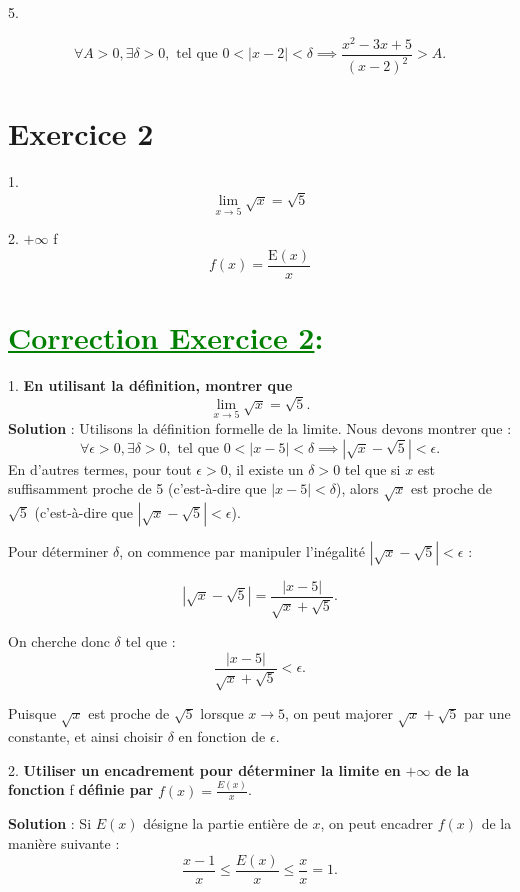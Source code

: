 \documentclass[12pt]{article}
\begin{document}
5. 

\[
\forall A > 0, \exists \delta > 0, \text{ tel que } 0 < |x - 2| < \delta \implies \frac{x^{2}-3x+5}{(x-2)^{2}} > A.
\]

\section*{Exercice 2}

1.  
\[\lim_{x \to 5} \sqrt{x} = \sqrt{5}\]

2.  $+\infty$  f \\
\[f(x) = \frac{\mathrm{E}(x)}{x}\]
\section*{\textcolor{green}{\underline{Correction Exercice 2}:}}

1. \textbf{En utilisant la définition, montrer que}
\[
\lim_{x \to 5} \sqrt{x} = \sqrt{5}.
\]
\textbf{Solution} : Utilisons la définition formelle de la limite. Nous devons montrer que :
\[
\forall \epsilon > 0, \exists \delta > 0, \text{ tel que } 0 < |x - 5| < \delta \implies |\sqrt{x} - \sqrt{5}| < \epsilon.
\]
En d'autres termes, pour tout \( \epsilon > 0 \), il existe un \( \delta > 0 \) tel que si \( x \) est suffisamment proche de 5 (c'est-à-dire que \( |x - 5| < \delta \)), alors \( \sqrt{x} \) est proche de \( \sqrt{5} \) (c'est-à-dire que \( |\sqrt{x} - \sqrt{5}| < \epsilon \)).

Pour déterminer \( \delta \), on commence par manipuler l'inégalité \( |\sqrt{x} - \sqrt{5}| < \epsilon \) :

\[
|\sqrt{x} - \sqrt{5}| = \frac{|x - 5|}{\sqrt{x} + \sqrt{5}}.
\]

On cherche donc \( \delta \) tel que :
\[
\frac{|x - 5|}{\sqrt{x} + \sqrt{5}} < \epsilon.
\]

Puisque \( \sqrt{x} \) est proche de \( \sqrt{5} \) lorsque \( x \to 5 \), on peut majorer \( \sqrt{x} + \sqrt{5} \) par une constante, et ainsi choisir \( \delta \) en fonction de \( \epsilon \).

2. \textbf{Utiliser un encadrement pour déterminer la limite en } $+\infty$ \textbf{ de la fonction } f \textbf{ définie par } $f(x) = \frac{E(x)}{x}$.

\textbf{Solution} : Si \( E(x) \) désigne la partie entière de \( x \), on peut encadrer \( f(x) \) de la manière suivante :
\[
\frac{x-1}{x} \leq \frac{E(x)}{x} \leq \frac{x}{x} = 1.
\]
\end{document}
